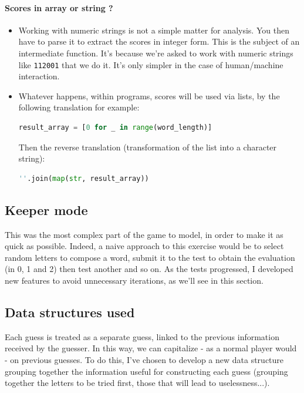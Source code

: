 \documentclass[10pt,a4paper,hidelinks]{article}
\begin{document}
\paragraph{Scores in array or string ?}
\begin{itemize}
    \item Working with numeric strings is not a simple matter for analysis. You then have to parse it to extract the scores in integer form. This is the subject of an intermediate function. It's because we're asked to work with numeric strings like \verb|112001| that we do it. It's only simpler in the case of human/machine interaction.
    \item Whatever happens, within programs, scores will be used via lists, by the following translation for example:
\begin{lstlisting}[language=Python]
result_array = [0 for _ in range(word_length)]
\end{lstlisting}
Then the reverse translation (transformation of the list into a character string):
\begin{lstlisting}[language=Python]
''.join(map(str, result_array))
\end{lstlisting}
\end{itemize}

\subsection{Keeper mode}
This was the most complex part of the game to model, in order to make it as quick as possible. Indeed, a naive approach to this exercise would be to select random letters to compose a word, submit it to the test to obtain the evaluation (in 0, 1 and 2) then test another and so on. As the tests progressed, I developed new features to avoid unnecessary iterations, as we'll see in this section.

\subsection{Data structures used}
Each guess is treated as a separate guess, linked to the previous information received by the guesser. In this way, we can capitalize - as a normal player would - on previous guesses. To do this, I've chosen to develop a new data structure grouping together the information useful for constructing each guess (grouping together the letters to be tried first, those that will lead to uselessness...).
\end{document}
